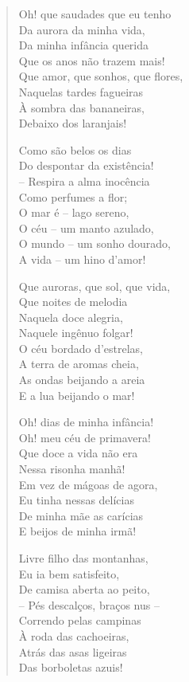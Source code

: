 \documentclass[10pt,a5paper,oneside]{book}
\begin{document}
\begin{verse}
Oh! que saudades que eu tenho\\
Da aurora da minha vida,\\
Da minha infância querida\\
Que os anos não trazem mais!\\
Que amor, que sonhos, que flores,\\
Naquelas tardes fagueiras\\
À sombra das bananeiras,\\
Debaixo dos laranjais!

Como são belos os dias\\
Do despontar da existência!\\
-- Respira a alma inocência\\
Como perfumes a flor;\\
O mar é -- lago sereno,\\
O céu -- um manto azulado,\\
O mundo -- um sonho dourado,\\
A vida -- um hino d'amor!

Que auroras, que sol, que vida,\\
Que noites de melodia\\
Naquela doce alegria,\\
Naquele ingênuo folgar!\\
O céu bordado d'estrelas,\\
A terra de aromas cheia,\\
As ondas beijando a areia\\
E a lua beijando o mar!

Oh! dias de minha infância!\\
Oh! meu céu de primavera!\\
Que doce a vida não era\\
Nessa risonha manhã!\\
Em vez de mágoas de agora,\\
Eu tinha nessas delícias\\
De minha mãe as carícias\\
E beijos de minha irmã!

Livre filho das montanhas,\\
Eu ia bem satisfeito,\\
De camisa aberta ao peito,\\
-- Pés descalços, braços nus --\\
Correndo pelas campinas\\
À roda das cachoeiras,\\
Atrás das asas ligeiras\\
Das borboletas azuis!


\end{verse}
\end{document}
